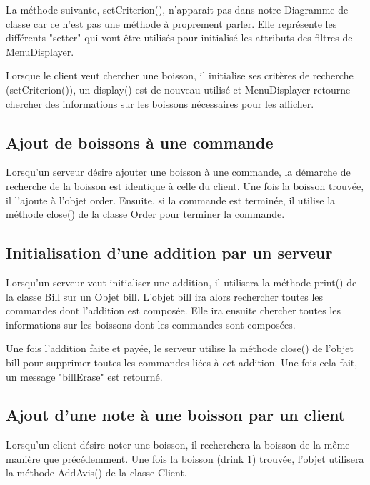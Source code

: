La méthode suivante, setCriterion(), n'apparait pas dans notre Diagramme de classe car ce n'est pas une méthode à proprement parler. Elle représente les différents "setter" qui vont être utilisés pour initialisé les attributs des filtres de MenuDisplayer. 

Lorsque le client veut chercher une boisson, il initialise ses critères de recherche (setCriterion()), un display() est de nouveau utilisé et MenuDisplayer retourne chercher des informations sur les boissons nécessaires pour les afficher. 

\subsection{Ajout de boissons à une commande}

Lorsqu'un serveur désire ajouter une boisson à une commande, la démarche de recherche de la boisson est identique à celle du client. Une fois la boisson trouvée, il l'ajoute à l'objet order. Ensuite, si la commande est terminée, il utilise la méthode close() de la classe Order pour terminer la commande.


\subsection{Initialisation d'une addition par un serveur}
Lorsqu'un serveur veut initialiser une addition, il utilisera la méthode print() de la classe Bill sur un Objet bill. L'objet bill ira alors rechercher toutes les commandes dont l'addition est composée. Elle ira ensuite chercher toutes les informations sur les boissons dont les commandes sont composées.

Une fois l'addition faite et payée, le serveur utilise la méthode close() de l'objet bill pour supprimer toutes les commandes liées à cet addition. Une fois cela fait, un message "billErase" est retourné.

\subsection{Ajout d'une note à une boisson par un client} 

Lorsqu'un client désire noter une boisson, il recherchera la boisson de la même manière que précédemment. Une fois la boisson (drink 1) trouvée, l'objet utilisera la méthode AddAvis() de la classe Client.


